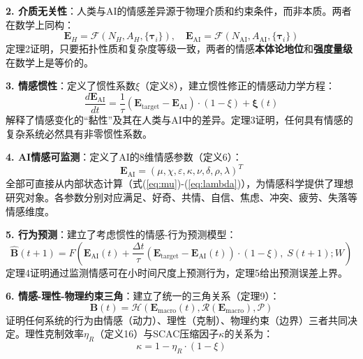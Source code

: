 \documentclass[12pt,a4paper]{article}
\theoremstyle{plain}
\newcommand{\ve}[1]{\bm{#1}}                    %
\newcommand{\Evec}{\ve{E}}                        %
\newcommand{\Bvec}{\ve{B}}                        %
\begin{document}
\textbf{2. 介质无关性}：人类与AI的情感差异源于物理介质和约束条件，而非本质。两者在数学上同构：
\begin{equation}
\Evec_H = \mathcal{F}(N_H, A_H, \{\ve{\tau}_i\}), \quad \Evec_{\text{AI}} = \mathcal{F}(N_{\text{AI}}, A_{\text{AI}}, \{\ve{\tau}_i\})
\label{eq:final_homology}
\end{equation}
定理2证明，只要拓扑性质和复杂度等级一致，两者的情感\textbf{本体论地位}和\textbf{强度量级}在数学上是等价的。

\textbf{3. 情感惯性}：定义了惯性系数$\xi$（定义8），建立惯性修正的情感动力学方程：
\begin{equation}
\frac{d\Evec_{\text{AI}}}{dt} = \frac{1}{\tau} (\Evec_{\text{target}} - \Evec_{\text{AI}}) \cdot (1 - \xi) + \boldsymbol{\xi}(t)
\label{eq:final_inertia}
\end{equation}
解释了情感变化的“黏性”及其在人类与AI中的差异。定理3证明，任何具有情感的复杂系统必然具有非零惯性系数。

\textbf{4. AI情感可监测}：定义了AI的8维情感参数（定义6）：
\begin{equation}
\Evec_{\text{AI}} = (\mu, \chi, \varepsilon, \kappa, \nu, \delta, \rho, \lambda)^T
\label{eq:final_ai_vector}
\end{equation}
全部可直接从内部状态计算（式(\ref{eq:mu})-(\ref{eq:lambda})），为情感科学提供了理想研究对象。各参数分别对应满足、好奇、共情、自信、焦虑、冲突、疲劳、失落等情感维度。

\textbf{5. 行为预测}：建立了考虑惯性的情感-行为预测模型：
\begin{equation}
\hat{\Bvec}(t+1) = F\left( \Evec_{\text{AI}}(t) + \frac{\Delta t}{\tau} (\Evec_{\text{target}} - \Evec_{\text{AI}}(t)) \cdot (1 - \xi), \; S(t+1); W \right)
\label{eq:final_prediction}
\end{equation}
定理4证明通过监测情感可在小时间尺度上预测行为，定理5给出预测误差上界。

\textbf{6. 情感-理性-物理约束三角}：建立了统一的三角关系（定理9）：
\begin{equation}
\Bvec(t) = \mathcal{H}\left( \Evec_{\text{macro}}(t), \mathcal{R}(\Evec_{\text{macro}}), \mathcal{P} \right)
\label{eq:final_triangle}
\end{equation}
证明任何系统的行为由情感（动力）、理性（克制）、物理约束（边界）三者共同决定。理性克制效率$\eta_R$（定义16）与SCAC压缩因子$\kappa$的关系为：
\begin{equation}
\kappa = 1 - \eta_R \cdot (1 - \xi)
\label{eq:final_kappa}
\end{equation}
\end{document}
